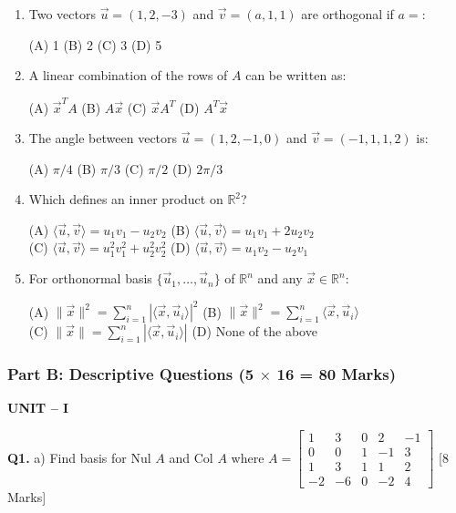 \documentclass[11pt,a4paper]{article}
\begin{document}
\begin{enumerate}
\item Two vectors $\vec{u} = (1, 2, -3)$ and $\vec{v} = (a, 1, 1)$ are orthogonal if $a =$:

(A) 1 \quad (B) 2 \quad (C) 3 \quad (D) 5

\item A linear combination of the rows of $A$ can be written as:

(A) $\vec{x}^T A$ \quad (B) $A\vec{x}$ \quad (C) $\vec{x} A^T$ \quad (D) $A^T \vec{x}$

\item The angle between vectors $\vec{u} = (1, 2, -1, 0)$ and $\vec{v} = (-1, 1, 1, 2)$ is:

(A) $\pi/4$ \quad (B) $\pi/3$ \quad (C) $\pi/2$ \quad (D) $2\pi/3$

\item Which defines an inner product on $\mathbb{R}^2$?

(A) $\langle \vec{u}, \vec{v} \rangle = u_1 v_1 - u_2 v_2$ \quad (B) $\langle \vec{u}, \vec{v} \rangle = u_1 v_1 + 2u_2 v_2$\\
(C) $\langle \vec{u}, \vec{v} \rangle = u_1^2 v_1^2 + u_2^2 v_2^2$ \quad (D) $\langle \vec{u}, \vec{v} \rangle = u_1 v_2 - u_2 v_1$

\item For orthonormal basis $\{\vec{u}_1, \ldots, \vec{u}_n\}$ of $\mathbb{R}^n$ and any $\vec{x} \in \mathbb{R}^n$:

(A) $\|\vec{x}\|^2 = \sum_{i=1}^{n} |\langle \vec{x}, \vec{u}_i \rangle|^2$ \quad (B) $\|\vec{x}\|^2 = \sum_{i=1}^{n} \langle \vec{x}, \vec{u}_i \rangle$\\
(C) $\|\vec{x}\| = \sum_{i=1}^{n} |\langle \vec{x}, \vec{u}_i \rangle|$ \quad (D) None of the above
\end{enumerate}

\subsubsection*{Part B: Descriptive Questions (5 $\times$ 16 = 80 Marks)}

\textbf{UNIT -- I}

\textbf{Q1.} a) Find basis for Nul $A$ and Col $A$ where $A = \begin{bmatrix} 1 & 3 & 0 & 2 & -1 \\ 0 & 0 & 1 & -1 & 3 \\ 1 & 3 & 1 & 1 & 2 \\ -2 & -6 & 0 & -2 & 4 \end{bmatrix}$ \hfill [8 Marks]
\end{document}
